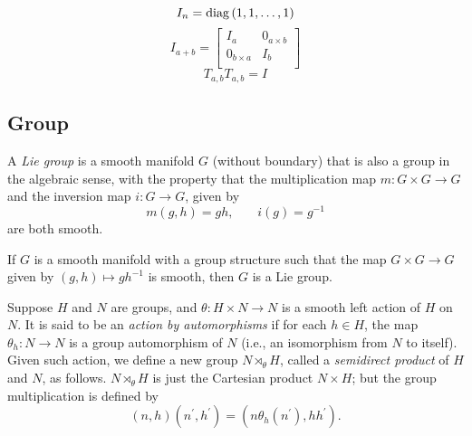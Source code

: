 \documentclass[stu, babel, american, biblatex, a4paper, leqno, draftall]{apa7}
\begin{document}
\begin{equation}\label{Matrix:Identity:Value}
    I_n=\operatorname{diag}{\left(1,1,\dots,1\right)}
\end{equation}
\begin{equation}\label{Matrix:Identity:Block}
    I_{a+b}=
    \begin{bmatrix}
    I_a & 0_{a\times b} \\
    0_{b\times a} & I_b \\
    \end{bmatrix}
\end{equation}
\begin{equation}\label{Matrix:Permutation:Square}
    T_{a,b} T_{a,b}= I
\end{equation}

\subsection{Group}

\begin{definition}\label{Group:Lie}
    A \textit{Lie group} is a smooth manifold $G$ (without boundary)
    that is also a group in the algebraic sense,
    with the property that
    the multiplication map $m:G\times G\to G$
    and the inversion map $i:G\to G$, given by
    \begin{equation*}
    m\left(g,h\right)=gh\text{,}
    \quad\quad
    i\left(g\right)=g^{-1}
    \end{equation*}
    are both smooth.
\end{definition}

\begin{proposition}\label{Group:Lie:Assertion}
If $G$ is a smooth manifold with a group structure such that the map $G\times G\to G$ given by $\left(g,h\right)\mapsto gh^{-1}$ is smooth, then $G$ is a Lie group.
\end{proposition}

\begin{definition}\label{Group:SemidirectProduct}
    Suppose $H$ and $N$ are groups,
    and $\theta:H\times N\to N$ is a smooth left action of $H$ on $N$.
    It is said to be an \textit{action by automorphisms} 
    if for each $h\in H$, the map $\theta_h:N\to N$ is a group automorphism of $N$ (i.e., an isomorphism from $N$ to itself).
    Given such action, we define a new group $N\rtimes_\theta H$, 
    called a \textit{semidirect product} of $H$ and $N$, as follows.
    $N\rtimes_\theta H$ is just the Cartesian product $N\times H$;
    but the group multiplication is defined by
    $$\left(n,h\right)\left(n^\prime,h^\prime\right)=\left(n\theta_h\left(n^\prime\right),hh^\prime\right)\text{.}$$
\end{definition}
\end{document}
